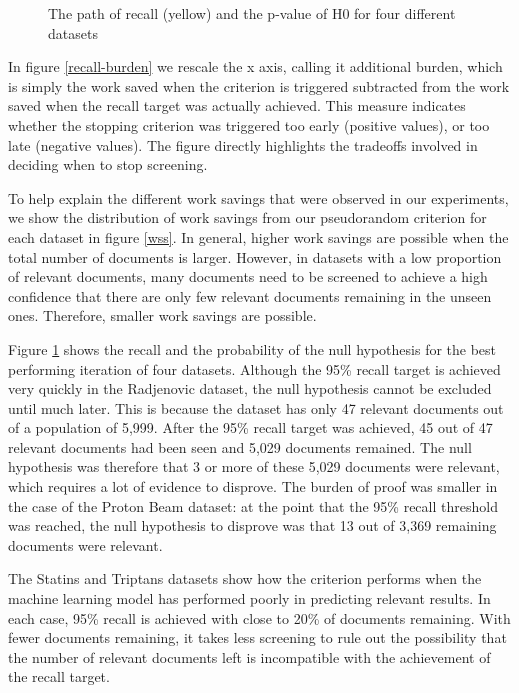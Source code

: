 \documentclass{bmcart}
\begin{document}
\begin{figure}
		\caption{\small The path of recall (yellow) and the p-value of H0 for four different datasets} 
		\label{H0paths}
	\end{figure}
	
	In figure \ref{recall-burden} we rescale the x axis, calling it additional burden, which is simply the work saved when the criterion is triggered subtracted from the work saved when the recall target was actually achieved. This measure indicates whether the stopping criterion was triggered too early (positive values), or too late (negative values). The figure directly highlights the tradeoffs involved in deciding when to stop screening. 
	
	To help explain the different work savings that were observed in our experiments, we show the distribution of work savings from our pseudorandom criterion for each dataset in figure \ref{wss}. In general, higher work savings are possible when the total number of documents is larger. However, in datasets with a low proportion of relevant documents, many documents need to be screened to achieve a high confidence that there are only few relevant documents remaining in the unseen ones. Therefore, smaller work savings are possible. 
	
	Figure \ref{H0paths} shows the recall and the probability of the null hypothesis for the best performing iteration of four datasets. Although the 95\% recall target is achieved very quickly in the Radjenovic dataset, the null hypothesis cannot be excluded until much later. This is because the dataset has only 47 relevant documents out of a population of 5,999. After the 95\% recall target was achieved, 45 out of 47 relevant documents had been seen and 5,029 documents remained. The null hypothesis was therefore that 3 or more of these 5,029 documents were relevant, which requires a lot of evidence to disprove. The burden of proof was smaller in the case of the Proton Beam dataset: at the point that the 95\% recall threshold was reached, the null hypothesis to disprove was that 13 out of 3,369 remaining documents were relevant. 
	
	The Statins and Triptans datasets show how the criterion performs when the machine learning model has performed poorly in predicting relevant results. In each case, 95\% recall is achieved with close to 20\% of documents remaining. With fewer documents remaining, it takes less screening to rule out the possibility that the number of relevant documents left is incompatible with the achievement of the recall target.
	
\end{document}
